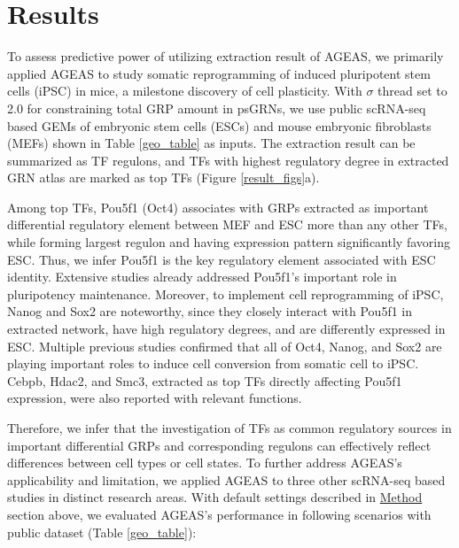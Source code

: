 \documentclass[fleqn,10pt]{wlscirep}
\begin{document}
\section*{Results}
  \label{res}
  To assess predictive power of utilizing extraction result of AGEAS, we primarily applied AGEAS to study somatic reprogramming of induced pluripotent stem cells (iPSC) in mice, \cite{yamanaka_2006} a milestone discovery of cell plasticity. \cite{cell_repro_review}
  With $\sigma$ thread set to 2.0 for constraining total GRP amount in psGRNs, we use public scRNA-seq based GEMs of embryonic stem cells (ESCs) and mouse embryonic fibroblasts (MEFs) shown in Table \ref{geo_table} as inputs.
  The extraction result can be summarized as TF regulons, and TFs with highest regulatory degree in extracted GRN atlas are marked as top TFs (Figure \ref{result_figs}a).

  Among top TFs, Pou5f1 (Oct4) associates with GRPs extracted as important differential regulatory element between MEF and ESC more than any other TFs, while forming largest regulon and having expression pattern significantly favoring ESC.
  Thus, we infer Pou5f1 is the key regulatory element associated with ESC identity.
  Extensive studies already addressed Pou5f1's important role in pluripotency maintenance. \cite{niwa_2007, oct4_1, oct4_2}
  Moreover, to implement cell reprogramming of iPSC, Nanog and Sox2 are noteworthy, since they closely interact with Pou5f1 in extracted network, have high regulatory degrees, and are differently expressed in ESC.
  Multiple previous studies confirmed that all of Oct4, Nanog, and Sox2 are playing important roles to induce cell conversion from somatic cell to iPSC. \cite{yamanaka_2006, ips7f, ipsOK, oct4_nanog_sox2_lin28, oct4_nanog_sox2}
  Cebpb, Hdac2, and Smc3, extracted as top TFs directly affecting Pou5f1 expression, were also reported with relevant functions. \cite{cebpb_ipsc, hdac2_ipsc, rad21_smc3_esc}

  Therefore, we infer that the investigation of TFs as common regulatory sources in important differential GRPs and corresponding regulons can effectively reflect differences between cell types or cell states.
  To further address AGEAS's applicability and limitation, we applied AGEAS to three other scRNA-seq based studies in distinct research areas.
  With default settings described in \hyperref[method]{Method} section above, we evaluated AGEAS's performance in following scenarios with public dataset (Table \ref{geo_table}):
\end{document}
